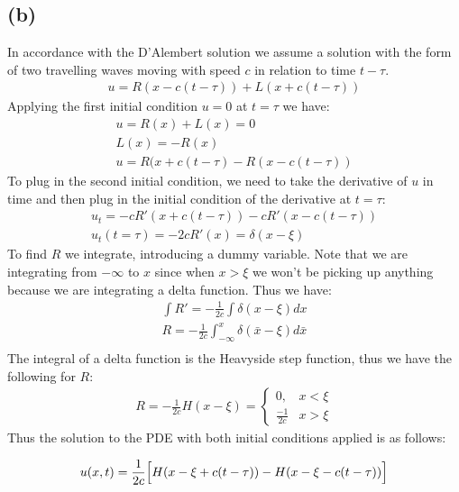 \documentclass{article}
\begin{document}
\subsection*{\textbf{(b)}}
In accordance with the D'Alembert solution we assume a solution with the form of two travelling waves moving with speed $c$ in relation to time $t-\tau$.
\begin{equation}
\begin{aligned}
u = R(x- c(t-\tau)) + L(x + c(t-\tau))
\end{aligned}
\end{equation}
Applying the first initial condition $u=0$ at $t=\tau$ we have:
\begin{equation}
\begin{aligned}
u = R(x) + L(x) = 0\\
L(x) = -R(x)\\
u = R(x + c(t-\tau) - R(x - c(t - \tau))
\end{aligned}
\end{equation}
To plug in the second initial condition, we need to take the derivative of $u$ in time and then plug in the initial condition of the derivative at $t=\tau$:
\begin{equation}
\begin{aligned}
u_t = -cR'(x+c(t-\tau)) - cR'(x-c(t-\tau))\\
u_t(t=\tau) = -2cR'(x) = \delta(x-\xi)
\end{aligned}
\end{equation}
To find $R$ we integrate, introducing a dummy variable. Note that we are integrating from $-\infty$ to $x$ since when $x>\xi$ we won't be picking up anything because we are integrating a delta function. Thus we have:
\begin{equation}
\begin{aligned}
\int R' = -\frac{1}{2c}\int \delta(x-\xi)dx\\
R = -\frac{1}{2c}\int_{-\infty}^x \delta(\bar{x}-\xi)d\bar{x}\\
\end{aligned}
\end{equation}
The integral of a delta function is the Heavyside step function, thus we have the following for $R$:
\begin{equation}
\begin{aligned}
R = -\frac{1}{2c}H(x-\xi) = 
 \begin{cases} 
      0, & x < \xi \\
      \frac{-1}{2c} &  x > \xi
   \end{cases}
\end{aligned}
\end{equation}
Thus the solution to the PDE with both initial conditions applied is as follows:
\begin{tcolorbox}[minipage,colback=white,arc=0pt,outer arc=0pt]
\begin{equation}
\begin{aligned}
u(x,t) = \frac{1}{2c} \Big{[}H(x - \xi + c(t-\tau)) - H(x- \xi - c(t-\tau)) \Big{]}
\end{aligned}
\end{equation}
\end{tcolorbox}
\end{document}
